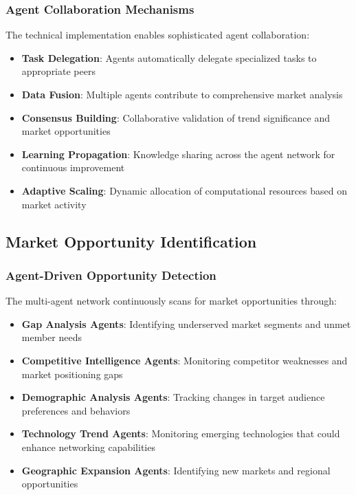 \subsubsection{Agent Collaboration Mechanisms}

The technical implementation enables sophisticated agent collaboration:

\begin{itemize}
    \item \textbf{Task Delegation}: Agents automatically delegate specialized tasks to appropriate peers
    \item \textbf{Data Fusion}: Multiple agents contribute to comprehensive market analysis
    \item \textbf{Consensus Building}: Collaborative validation of trend significance and market opportunities
    \item \textbf{Learning Propagation}: Knowledge sharing across the agent network for continuous improvement
    \item \textbf{Adaptive Scaling}: Dynamic allocation of computational resources based on market activity
\end{itemize}

\subsection{Market Opportunity Identification}

\subsubsection{Agent-Driven Opportunity Detection}

The multi-agent network continuously scans for market opportunities through:

\begin{itemize}
    \item \textbf{Gap Analysis Agents}: Identifying underserved market segments and unmet member needs
    \item \textbf{Competitive Intelligence Agents}: Monitoring competitor weaknesses and market positioning gaps
    \item \textbf{Demographic Analysis Agents}: Tracking changes in target audience preferences and behaviors
    \item \textbf{Technology Trend Agents}: Monitoring emerging technologies that could enhance networking capabilities
    \item \textbf{Geographic Expansion Agents}: Identifying new markets and regional opportunities
\end{itemize}

